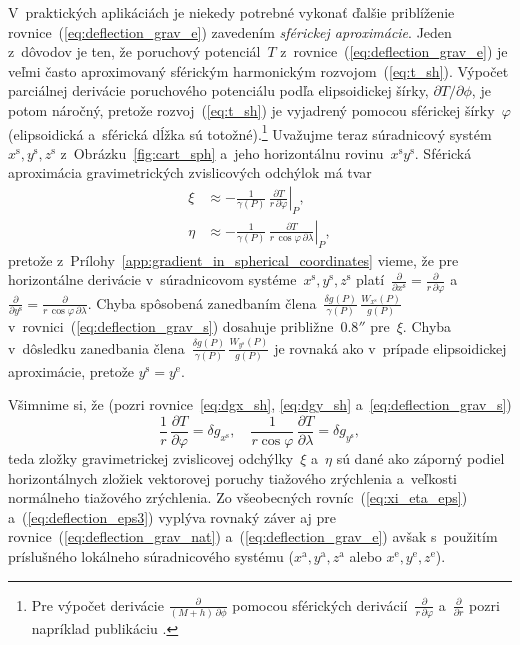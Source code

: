 \documentclass[a4paper, 12pt]{book}
\begin{document}
V~praktických aplikáciách je niekedy potrebné vykonať ďalšie priblíženie 
rovnice~(\ref{eq:deflection_grav_e}) zavedením \emph{sférickej aproximácie}.  
Jeden z~dôvodov je ten, že poruchový potenciál~$T$ 
z~rovnice~(\ref{eq:deflection_grav_e}) je veľmi často aproximovaný sférickým 
harmonickým rozvojom~(\ref{eq:t_sh}).  Výpočet parciálnej derivácie poruchového 
potenciálu podľa elipsoidickej šírky, $\partial T / \partial \phi$, je potom 
náročný, pretože rozvoj~(\ref{eq:t_sh}) je vyjadrený pomocou sférickej 
šírky~$\varphi$ (elipsoidická a~sférická dĺžka sú totožné).\footnote{Pre 
výpočet derivácie $\frac{\partial}{(M + h) \, \partial\phi}$ pomocou sférických 
derivácií~$\frac{\partial}{r \, \partial \varphi}$ a~$\frac{\partial}{\partial 
r}$ pozri napríklad publikáciu \textcite{Jekeli1999b}.}  Uvažujme teraz 
súradnicový systém~$x^\mathrm{s}, y^\mathrm{s}, z^\mathrm{s}$ 
z~Obrázku~\ref{fig:cart_sph} a~jeho horizontálnu 
rovinu~$x^\mathrm{s}y^\mathrm{s}$.  Sférická aproximácia gravimetrických 
zvislicových odchýlok má tvar \parencite{Jekeli1999b}
%
\begin{equation}
\label{eq:deflection_grav_s}
\begin{split}
\xi &\approx -\frac{1}{\gamma(P)} \, \left.\frac{\partial T}{r\, \partial 
\varphi}\right|_P{,}\\
%
\eta &\approx -\frac{1}{\gamma(P)} \, \left.\frac{\partial T}{r \, \cos\varphi 
\, \partial \lambda}\right|_P{,}
\end{split}
\end{equation}
%
pretože z~Prílohy~\ref{app:gradient_in_spherical_coordinates} vieme, že pre 
horizontálne derivácie v~súradnicovom systéme~$x^\mathrm{s}, y^\mathrm{s}, 
z^\mathrm{s}$ platí~$\frac{\partial}{\partial x^\mathrm{s}} = \frac{\partial}{r 
\, \partial\varphi}$ a~$\frac{\partial}{\partial y^\mathrm{s}} 
= \frac{\partial}{r \, \cos\varphi \, \partial\lambda}$.  Chyba spôsobená 
zanedbaním člena~$\frac{\delta g(P)}{\gamma(P)} \, 
\frac{W_{x^\mathrm{s}}(P)}{g(P)}$ v~rovnici~(\ref{eq:deflection_grav_s}) 
dosahuje približne~$0.8''$ pre~$\xi$.  Chyba v~dôsledku zanedbania 
člena~$\frac{\delta g(P)}{\gamma(P)} \, \frac{W_{y^\mathrm{s}}(P)}{g(P)}$ je 
rovnaká ako v~prípade elipsoidickej aproximácie, pretože $y^\mathrm{s} 
= y^\mathrm{e}$.

Všimnime si, že (pozri rovnice~\ref{eq:dgx_sh}, \ref{eq:dgy_sh} 
a~\ref{eq:deflection_grav_s})
%
\begin{equation}
\label{eq:dg_horizontal}
\frac{1}{r} \, \frac{\partial T}{\partial \varphi} = \delta g_{x^\mathrm{s}}{,} 
\quad \frac{1}{r \cos\varphi} \, \frac{\partial T}{\partial \lambda} = \delta 
g_{y^\mathrm{s}}{,}
\end{equation}
%
teda zložky gravimetrickej zvislicovej odchýlky~$\xi$ a~$\eta$ sú dané ako 
záporný podiel horizontálnych zložiek vektorovej poruchy tiažového zrýchlenia 
a~veľkosti normálneho tiažového zrýchlenia.  Zo všeobecných 
rovníc~(\ref{eq:xi_eta_eps}) a~(\ref{eq:deflection_eps3}) vyplýva rovnaký záver 
aj pre rovnice~(\ref{eq:deflection_grav_nat}) a~(\ref{eq:deflection_grav_e}) 
avšak s~použitím príslušného lokálneho súradnicového systému ($x^\mathrm{a}, 
y^\mathrm{a}, z^\mathrm{a}$ alebo $x^\mathrm{e}, y^\mathrm{e}, z^\mathrm{e}$).
\end{document}
